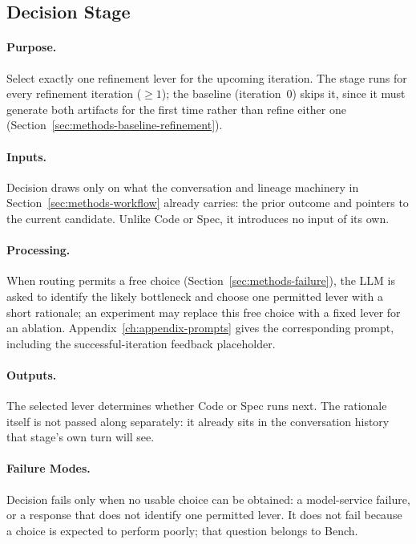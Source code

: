 \FloatBarrier

\subsection{Decision Stage}
\label{sec:methods-decision}

\paragraph{Purpose.}
Select exactly one refinement lever for the upcoming iteration. The stage
runs for every refinement iteration ($\geq 1$); the baseline (iteration~0)
skips it, since it must generate both artifacts for the first time rather
than refine either one (Section~\ref{sec:methods-baseline-refinement}).

\paragraph{Inputs.}
Decision draws only on what the conversation and lineage machinery in
Section~\ref{sec:methods-workflow} already carries: the prior outcome and
pointers to the current candidate. Unlike Code or Spec, it introduces no
input of its own.

\paragraph{Processing.}
When routing permits a free choice (Section~\ref{sec:methods-failure}), the
LLM is asked to identify the likely bottleneck and choose one permitted
lever with a short rationale; an experiment may replace this free choice
with a fixed lever for an ablation. Appendix~\ref{ch:appendix-prompts} gives
the corresponding prompt, including the successful-iteration feedback
placeholder.

\paragraph{Outputs.}
The selected lever determines whether Code or Spec runs next. The rationale
itself is not passed along separately: it already sits in the conversation
history that stage's own turn will see.

\paragraph{Failure Modes.}
Decision fails only when no usable choice can be obtained: a model-service
failure, or a response that does not identify one permitted lever. It does
not fail because a choice is expected to perform poorly; that question
belongs to Bench.

